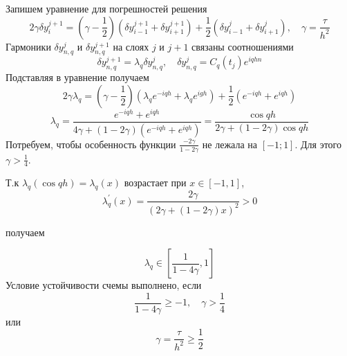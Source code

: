 \documentclass[12pt,a4paper]{article}
\renewcommand{\geq}{\geqslant}
\begin{document}
Запишем уравнение для погрешностей решения
$$ 2\gamma \delta y_i^{j+1} = (\gamma-\frac{1}{2})(\delta y_{i-1}^{j+1} + \delta y_{i+1}^{j+1}) +\frac{1}{2}(\delta y_{i-1}^j + \delta y_{i+1}^j), \quad \gamma = \frac{\tau}{h^2}$$
Гармоники $\delta y_{n,q}^j$ и $\delta y_{n,q}^{j+1}$ на слоях $j$ и $j+1$ связаны соотношениями
$$\delta y_{n,q}^{j+1} = \lambda_q\delta y_{n,q}^j, \quad \delta y_{n,q}^j = C_q(t_j)e^{iqhn}$$
Подставляя в уравнение получаем
$$2\gamma\lambda_q = (\gamma - \frac{1}{2})(\lambda_q e^{-iqh} + \lambda_q e^{igh}) + \frac{1}{2}(e^{-iqh} + e^{iqh})$$
$$\lambda_q = \frac{e^{-iqh} + e^{iqh}}{4\gamma +(1 - 2\gamma)(e^{-iqh} + e^{iqh})} = \frac{\cos{qh}}{2\gamma +(1 - 2\gamma)\cos{qh}}$$
Потребуем, чтобы особенность функции $\frac{-2\gamma}{1-2\gamma}$ не лежала на $[-1;1]$. Для этого  $\gamma > \frac{1}{4}$.

\begin{flushleft}
 Т.к $\lambda_q(\cos{qh}) = \lambda_q(x)\text{ возрастает при } x\in [-1,1]$, 
 $$\lambda_q ^{'}(x) = \frac{2\gamma}{(2\gamma +(1-2\gamma)x)^2} > 0$$
\begin{flushleft}
получаем
\end{flushleft}
 \end{flushleft} $$\lambda_q \in [\frac{1}{1-4\gamma}, 1]$$
Условие устойчивости счемы выполнено, если 
$$\frac{1}{1-4\gamma}\geq -1, \quad \gamma > \frac{1}{4}$$
или $$\gamma = \frac{\tau}{h^2} \geq \frac{1}{2}$$
\end{document}
